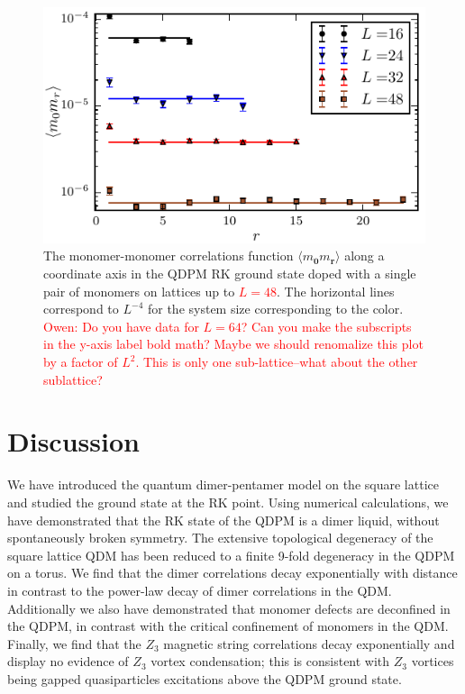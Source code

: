 \documentclass[twocolumn,prb,aps,floatfix,superscriptaddress]{revtex4-1}
\newcommand{\note}[1]{\textcolor{red}{#1}}
\begin{document}
    \begin{figure}[]
        \centering
        \includegraphics[width=1.0\columnwidth]{monomer_cor_log.pdf}
        \caption{ The monomer-monomer correlations function $\langle m_{\bm{0}} m_{\bm{r}} \rangle$ along a coordinate axis in the QDPM RK ground state doped with a single pair of monomers on lattices up to \note{$L=48$}. The horizontal lines correspond to $L^{-4}$ for the system size corresponding to the color. \note{Owen: Do you have data for $L=64$? Can you make the subscripts in the y-axis label bold math? Maybe we should renomalize this plot by a factor of $L^2$. This is only one sub-lattice--what about the other sublattice?}}
        \label{fig:monomer_correlations}
    \end{figure}

\section{Discussion}

We have introduced the quantum dimer-pentamer model on the square lattice and studied the ground state at the RK point. Using numerical calculations, we have demonstrated that the RK state of the QDPM is a dimer liquid, without spontaneously broken symmetry. The extensive topological degeneracy of the square lattice QDM has been reduced to a finite 9-fold degeneracy in the QDPM on a torus. We find that the dimer correlations decay exponentially with distance in contrast to the power-law decay of dimer correlations in the QDM. Additionally we also have demonstrated that monomer defects are deconfined in the QDPM, in contrast with the critical confinement of monomers in the QDM. Finally, we find that the $Z_3$ magnetic string correlations decay exponentially and display no evidence of $Z_3$ vortex condensation; this is consistent with $Z_3$ vortices being gapped quasiparticles excitations above the QDPM ground state. 
\end{document}
